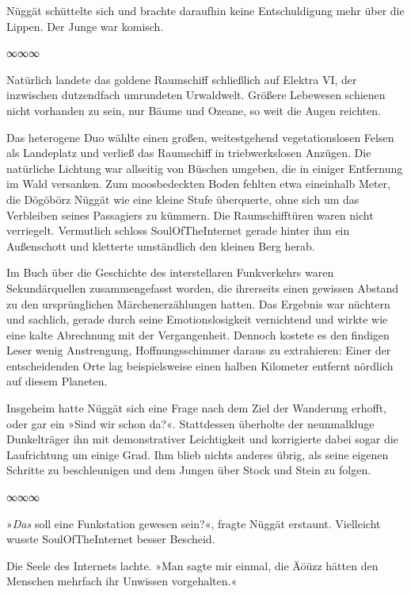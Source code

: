 Nüggät schüttelte sich und brachte daraufhin keine Entschuldigung mehr über die Lippen. Der Junge war komisch.

\begin{center}
∞∞∞
\end{center}

Natürlich landete das goldene Raumschiff schließlich auf Elektra VI, der inzwischen dutzendfach umrundeten Urwaldwelt. Größere Lebewesen schienen nicht vorhanden zu sein, nur Bäume und Ozeane, so weit die Augen reichten.

Das heterogene Duo wählte einen großen, weitestgehend vegetationslosen Felsen als Landeplatz und verließ das Raumschiff in triebwerkslosen Anzügen. Die natürliche Lichtung war allseitig von Büschen umgeben, die in einiger Entfernung im Wald versanken. Zum moosbedeckten Boden fehlten etwa eineinhalb Meter, die Dögöbörz Nüggät wie eine kleine Stufe überquerte, ohne sich um das Verbleiben seines Passagiers zu kümmern. Die Raumschifftüren waren nicht verriegelt. Vermutlich schloss SoulOfTheInternet gerade hinter ihm ein Außenschott und kletterte umständlich den kleinen Berg herab.

Im Buch über die Geschichte des interstellaren Funkverkehrs waren Sekundärquellen zusammengefasst worden, die ihrerseits einen gewissen Abstand zu den ursprünglichen Märchenerzählungen hatten. Das Ergebnis war nüchtern und sachlich, gerade durch seine Emotionslosigkeit vernichtend und wirkte wie eine kalte Abrechnung mit der Vergangenheit. Dennoch kostete es den findigen Leser wenig Anstrengung, Hoffnungsschimmer daraus zu extrahieren: Einer der entscheidenden Orte lag beispielsweise einen halben Kilometer entfernt nördlich auf diesem Planeten.

Insgeheim hatte Nüggät sich eine Frage nach dem Ziel der Wanderung erhofft, oder gar ein »Sind wir schon da?«. Stattdessen überholte der neunmalkluge Dunkelträger ihn mit demonstrativer Leichtigkeit und korrigierte dabei sogar die Laufrichtung um einige Grad. Ihm blieb nichts anderes übrig, als seine eigenen Schritte zu beschleunigen und dem Jungen über Stock und Stein zu folgen.

\begin{center}
∞∞∞
\end{center}

»\emph{Das} soll eine Funkstation gewesen sein?«, fragte Nüggät erstaunt. Vielleicht wusste SoulOfTheInternet besser Bescheid.

Die Seele des Internets lachte. »Man sagte mir einmal, die Äöüzz hätten den Menschen mehrfach ihr Unwissen vorgehalten.«

